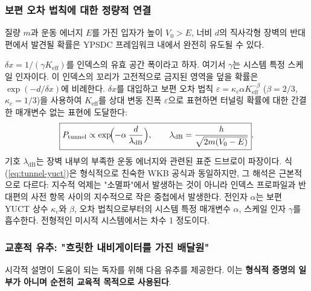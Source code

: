 \documentclass[12pt,a4paper]{article}
\begin{document}
	\subsubsection{보편 오차 법칙에 대한 정량적 연결}
	
	질량 $m$과 운동 에너지 $E$를 가진 입자가 높이 $V_0>E$, 너비 $d$의 직사각형 장벽의 반대편에서 발견될 확률은 YPSDC 프레임워크 내에서 완전히 유도될 수 있다.
	
	$\delta x = 1/(\gamma K_{\mathrm{eff}})$를 인덱스의 유효 공간 폭이라고 하자. 여기서 $\gamma$는 시스템 특정 스케일 인자이다. 이 인덱스의 꼬리가 고전적으로 금지된 영역을 덮을 확률은 $\exp(-d / \delta x)$에 비례한다. $\delta x$를 대입하고 보편 오차 법칙 $\varepsilon = \kappa_c \alpha K_{\mathrm{eff}}^{-\beta}$ ($\beta=2/3$, $\kappa_c=1/3$)을 사용하여 $K_{\mathrm{eff}}$를 상대 변동 진폭 $\varepsilon$으로 표현하면 터널링 확률에 대한 간결한 매개변수 없는 표현에 도달한다:
	\begin{equation}
		\boxed{ P_{\mathrm{tunnel}} \propto \exp\!\Bigl( -\alpha \,
			\frac{d}{\lambda_{\mathrm{dB}}} \Bigr),
			\qquad
			\lambda_{\mathrm{dB}} = \frac{h}{\sqrt{2m(V_0-E)}} }.
		\label{eq:tunnel-yuct}
	\end{equation}
	기호 $\lambda_{\mathrm{dB}}$는 장벽 내부의 부족한 운동 에너지와 관련된 표준 드브로이 파장이다. 식 (\ref{eq:tunnel-yuct})은 형식적으로 친숙한 WKB 공식과 동일하지만, 그 해석은 근본적으로 다르다: 지수적 억제는 "소멸파"에서 발생하는 것이 아니라 인덱스 프로파일과 반대편의 사전 항목 사이의 지수적으로 작은 중첩에서 발생한다. 전인자 $\alpha$는 보편 YUCT 상수 $\kappa_c$와 $\beta$, 오차 법칙으로부터의 시스템 특정 매개변수 $\alpha$, 스케일 인자 $\gamma$를 흡수한다. 전형적인 미시적 시스템에서는 차수 1 정도이다.
	
	\subsubsection{교훈적 유추: "흐릿한 내비게이터를 가진 배달원"}
	
	시각적 설명이 도움이 되는 독자를 위해 다음 유추를 제공한다. 이는 \textbf{형식적 증명의 일부가 아니며 순전히 교육적 목적으로 사용된다}.
	
	\medskip
	\medskip
	
\end{document}
